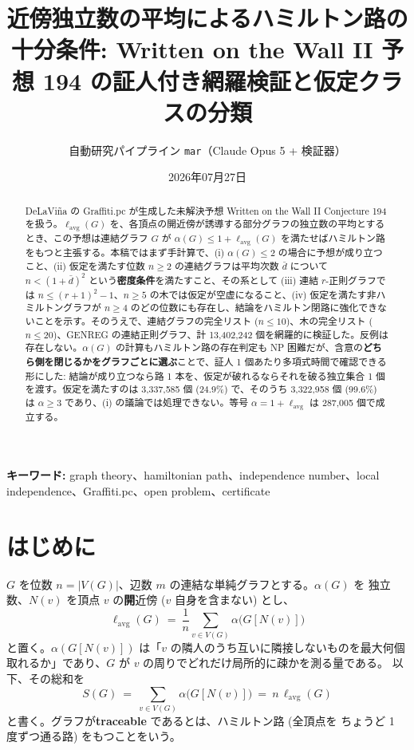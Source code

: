 \documentclass[paper=a4,fontsize=10.5pt,jafontsize=10.5pt]{jlreq}
\title{近傍独立数の平均によるハミルトン路の十分条件: Written on the Wall II 予想 194 の証人付き網羅検証と仮定クラスの分類}
\author{自動研究パイプライン \texttt{mar}（Claude Opus 5 + 検証器）}
\date{2026年07月27日}
\theoremstyle{plain}
\theoremstyle{definition}
\begin{document}
\maketitle

\begin{abstract}
DeLaViña の Graffiti.pc が生成した未解決予想 Written on the Wall II Conjecture 194 を扱う。$\ell_{\mathrm{avg}}(G)$ を、各頂点の開近傍が誘導する部分グラフの独立数の平均とするとき、この予想は連結グラフ $G$ が $\alpha(G) \le 1 + \ell_{\mathrm{avg}}(G)$ を満たせばハミルトン路をもつと主張する。本稿ではまず手計算で、(i) $\alpha(G) \le 2$ の場合に予想が成り立つこと、(ii) 仮定を満たす位数 $n \ge 2$ の連結グラフは平均次数 $\bar{d}$ について $n < (1+\bar{d})^2$ という\textbf{密度条件}を満たすこと、その系として (iii) 連結 $r$-正則グラフでは $n \le (r+1)^2 - 1$、$n \ge 5$ の木では仮定が空虚になること、(iv) 仮定を満たす非ハミルトングラフが $n \ge 4$ のどの位数にも存在し、結論をハミルトン閉路に強化できないことを示す。そのうえで、連結グラフの完全リスト ($n \le 10$)、木の完全リスト ($n \le 20$)、GENREG の連結正則グラフ、計 13,402,242 個を網羅的に検証した。反例は存在しない。$\alpha(G)$ の計算もハミルトン路の存在判定も NP 困難だが、含意の\textbf{どちら側を閉じるかをグラフごとに選ぶ}ことで、証人 1 個あたり多項式時間で確認できる形にした: 結論が成り立つなら路 1 本を、仮定が破れるならそれを破る独立集合 1 個を渡す。仮定を満たすのは 3,337,585 個 (24.9\%) で、そのうち 3,322,958 個 (99.6\%) は $\alpha \ge 3$ であり、(i) の議論では処理できない。等号 $\alpha = 1 + \ell_{\mathrm{avg}}$ は 287,005 個で成立する。
\end{abstract}

\noindent\textbf{キーワード:} graph theory、hamiltonian path、independence number、local independence、Graffiti.pc、open problem、certificate


\section{はじめに}

$G$ を位数 $n = |V(G)|$、辺数 $m$ の連結な単純グラフとする。$\alpha(G)$ を
独立数、$N(v)$ を頂点 $v$ の\textbf{開}近傍 ($v$ 自身を含まない) とし、
\[ \ell_{\mathrm{avg}}(G) \ = \ \frac{1}{n} \sum_{v \in V(G)}
   \alpha\bigl(G[N(v)]\bigr) \]
と置く。$\alpha(G[N(v)])$ は「$v$ の隣人のうち互いに隣接しないものを最大何個
取れるか」であり、$G$ が $v$ の周りでどれだけ局所的に疎かを測る量である。
以下、その総和を
\[ S(G) \ = \ \sum_{v \in V(G)} \alpha\bigl(G[N(v)]\bigr)
   \ = \ n \, \ell_{\mathrm{avg}}(G) \]
と書く。グラフが\textbf{traceable} であるとは、ハミルトン路 (全頂点を
ちょうど 1 度ずつ通る路) をもつことをいう。
\end{document}
